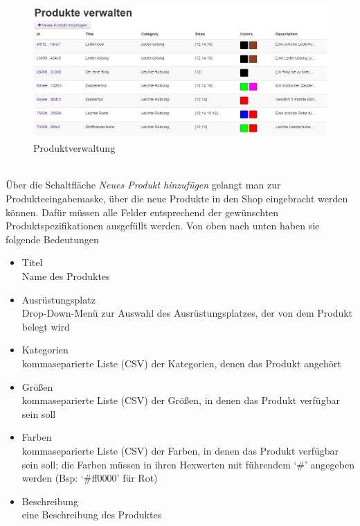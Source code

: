 \begin{figure}[h!]
  \centering
  \includegraphics[width=\textwidth]{img/Produkte.png}
  \caption{Produktverwaltung}
  \label{fig:Produktverwaltung}
\end{figure}
\text{}\vspace*{-1em}\\
Über die Schaltfläche \textit{Neues Produkt hinzufügen} gelangt man zur Produkteeingabemaske, über die neue Produkte in den Shop eingebracht werden können. Dafür müssen alle Felder entsprechend der gewünschten Produktspezifikationen ausgefüllt werden. Von oben nach unten haben sie folgende Bedeutungen
\begin{itemize}
  \item Titel \\
        Name des Produktes
  \vspace*{-0.5em}
  \item Ausrüstungsplatz \\
        Drop-Down-Menü zur Auswahl  des Ausrüstungsplatzes, der von dem Produkt belegt wird
  \vspace*{-0.5em}
  \item Kategorien \\
        kommaseparierte Liste (CSV) der Kategorien, denen das Produkt angehört
  \vspace*{-0.5em}
  \item Größen \\
        kommaseparierte Liste (CSV) der Größen, in denen das Produkt verfügbar sein soll
  \vspace*{-0.5em}
  \item Farben \\
        kommaseparierte Liste (CSV) der Farben, in denen das Produkt verfügbar sein soll; die Farben müssen in ihren Hexwerten mit führendem ‘\#’ angegeben werden (Bsp: ‘\#ff0000’ für Rot)
  \vspace*{-0.5em}
  \item Beschreibung \\
        eine Beschreibung des Produktes
\end{itemize}
